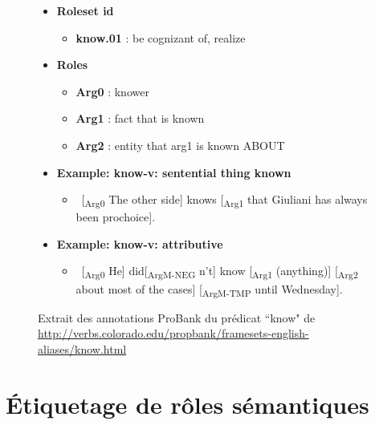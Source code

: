\documentclass{KodeBook}
\begin{document}
\begin{figure}
	\scriptsize
	\begin{itemize}
		\item \textbf{Roleset id}
		\begin{itemize}\scriptsize
			\item \textbf{know.01} : be cognizant of, realize
		\end{itemize}
		\item \textbf{Roles}
		\begin{itemize}\scriptsize
			\item \textbf{Arg0} : knower
			\item \textbf{Arg1} : fact that is known
			\item \textbf{Arg2} : entity that arg1 is known ABOUT
		\end{itemize}
		
		\item \textbf{Example: know-v: sentential thing known}
		\begin{itemize}\scriptsize
			\item \ [\textsubscript{\color{red}Arg0} The other side] knows [\textsubscript{\color{red}Arg1} that Giuliani has always been prochoice].
		\end{itemize}
		
		\item \textbf{Example: know-v: attributive}
		\begin{itemize}\scriptsize
			\item \ [\textsubscript{\color{red}Arg0} He] did[\textsubscript{\color{red}ArgM-NEG} n't] know [\textsubscript{\color{red}Arg1} (anything)] [\textsubscript{\color{red}Arg2} about most of the cases] [\textsubscript{\color{red}ArgM-TMP} until Wednesday].
		\end{itemize}
	\end{itemize}
	
	\caption{Extrait des annotations ProBank du prédicat ``know" de \url{http://verbs.colorado.edu/propbank/framesets-english-aliases/know.html}}
\end{figure}

\section{Étiquetage de rôles sémantiques}
\end{document}
